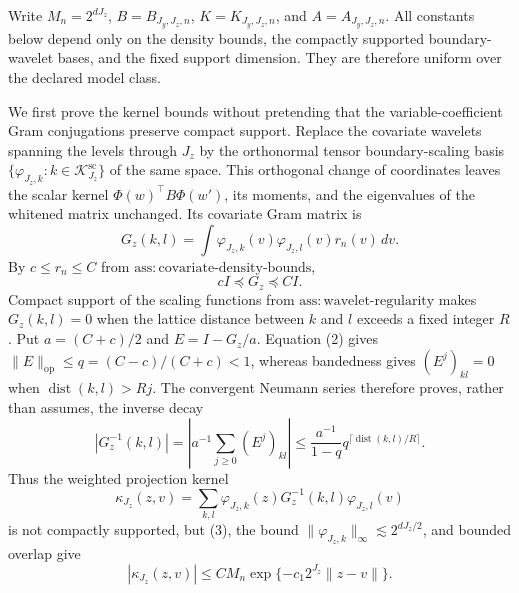 Write \(M_n=2^{dJ_z}\), \(B=B_{J_y,J_z,n}\), \(K=K_{J_y,J_z,n}\), and \(A=A_{J_y,J_z,n}\).  All constants below depend only on the density bounds, the compactly supported boundary-wavelet bases, and the fixed support dimension.  They are therefore uniform over the declared model class.

We first prove the kernel bounds without pretending that the variable-coefficient Gram conjugations preserve compact support.  Replace the covariate wavelets spanning the levels through \(J_z\) by the orthonormal tensor boundary-scaling basis \(\{\varphi_{J_z,k}:k\in\mathcal K_{J_z}^{\mathrm{sc}}\}\) of the same space.  This orthogonal change of coordinates leaves the scalar kernel \(\Phi(w)^{\top}B\Phi(w')\), its moments, and the eigenvalues of the whitened matrix unchanged.  Its covariate Gram matrix is
\[
G_z(k,l)=\int\varphi_{J_z,k}(v)\varphi_{J_z,l}(v)r_n(v)\,dv.
\tag{1}
\]
By \(c\le r_n\le C\) from \(\mathrm{ass{:}covariate\text{-}density\text{-}bounds}\),
\[
cI\preceq G_z\preceq CI.
\tag{2}
\]
Compact support of the scaling functions from \(\mathrm{ass{:}wavelet\text{-}regularity}\) makes \(G_z(k,l)=0\) when the lattice distance between \(k\) and \(l\) exceeds a fixed integer \(R\).  Put \(a=(C+c)/2\) and \(E=I-G_z/a\).  Equation (2) gives \(\|E\|_{\mathrm{op}}\le q=(C-c)/(C+c)<1\), whereas bandedness gives \((E^j)_{kl}=0\) when \(\operatorname{dist}(k,l)>Rj\).  The convergent Neumann series therefore proves, rather than assumes, the inverse decay
\[
|G_z^{-1}(k,l)|
=\left|a^{-1}\sum_{j\ge0}(E^j)_{kl}\right|
\le \frac{a^{-1}}{1-q}q^{\lceil\operatorname{dist}(k,l)/R\rceil}.
\tag{3}
\]
Thus the weighted projection kernel
\[
\kappa_{J_z}(z,v)=\sum_{k,l}\varphi_{J_z,k}(z)G_z^{-1}(k,l)\varphi_{J_z,l}(v)
\]
is not compactly supported, but (3), the bound \(\|\varphi_{J_z,k}\|_\infty\lesssim2^{dJ_z/2}\), and bounded overlap give
\[
|\kappa_{J_z}(z,v)|
\le C M_n\exp\{-c_1 2^{J_z}\|z-v\|\}.
\tag{4}
\]

